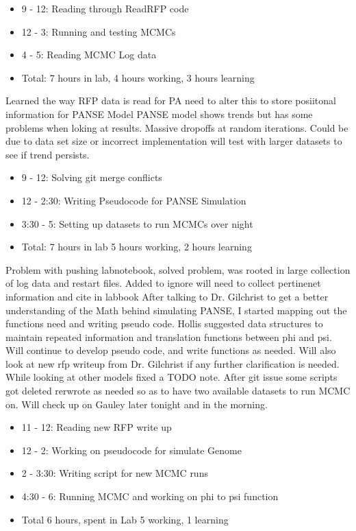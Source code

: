\documentclass[12pt,hyperref]{labbook}
\begin{document}
\begin{itemize}
    \item 9 - 12: Reading through ReadRFP code
    \item 12 - 3: Running and testing MCMCs
    \item 4 - 5: Reading MCMC Log data
    \item Total: 7 hours in lab, 4 hours working, 3 hours learning
\end{itemize}
Learned the way RFP data is read for PA need to alter this to store posiitonal information for PANSE Model
PANSE model shows trends but has some problems when loking at results. Massive dropoffs at random iterations. Could be due to data set size or incorrect implementation will test with larger datasets to see if trend persists.
\begin{itemize}
    \item 9 - 12: Solving git merge conflicts
    \item 12 - 2:30: Writing Pseudocode for PANSE Simulation
    \item 3:30 - 5: Setting up datasets to run MCMCs over night
    \item Total: 7 hours in lab 5 hours working, 2 hours learning
\end{itemize}
Problem with pushing labnotebook, solved problem, was rooted in large collection of log data and restart files. Added to ignore will need to collect pertinenet information and cite in labbook
After talking to Dr. Gilchrist to get a better understanding of the Math behind simulating PANSE, I started mapping out the functions need and writing pseudo code. Hollis suggested data structures to maintain repeated information and translation functions between phi and psi. Will continue to develop pseudo code, and write functions as needed. Will also look at new rfp writeup from Dr. Gilchrist if any further clarification is needed. While looking at other models fixed a
TODO note.
After git issue some scripts got deleted rerwrote as needed so as to have two available datasets to run MCMC on. Will check up on Gauley later tonight and in the morning.
\begin{itemize}
    \item 11 - 12: Reading new RFP write up
    \item 12 - 2: Working on pseudocode for simulate Genome
    \item 2 - 3:30: Writing script for new MCMC runs
    \item 4:30 - 6: Running MCMC and working on phi to psi function
    \item Total 6 hours, spent in Lab 5 working, 1 learning
\end{itemize}
\end{document}

